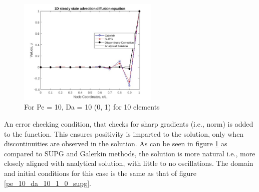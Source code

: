 \documentclass[12pt, oneside]{article}
\begin{document}
\begin{figure}[!h]
\centering
 \includegraphics[width=0.6\textwidth]{pe_10_da_10_ppv_0_1.jpg}
 \caption{For Pe = 10, Da = 10 (0, 1) for 10 elements}
 \label{pe_10_da_10_ppv_0_1}
\end{figure}
An error checking condition, that checks for sharp gradients (i.e., norm) is added to the function. This ensures positivity is imparted to the solution, only when discontinuities are observed in the solution. As can be seen in figure \ref{pe_10_da_10_ppv_0_1} as compared to SUPG and Galerkin methods, the solution is more natural i.e., more closely aligned with analytical solution, with little to no oscillations. The domain and initial conditions for this case is the same as that of figure \ref{pe_10_da_10_1_0_supg}.
\end{document}
